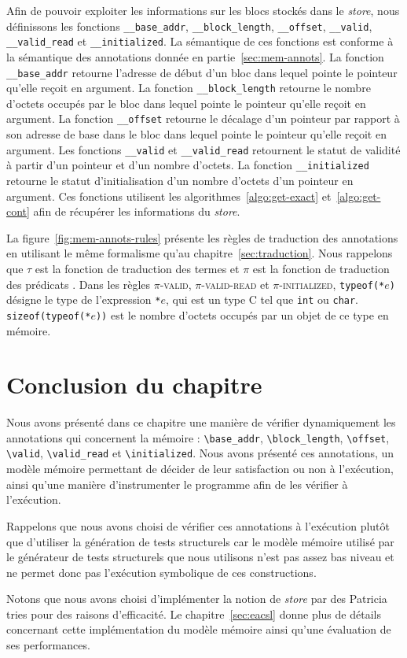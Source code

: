 Afin de pouvoir exploiter les informations sur les blocs stockés dans le
\textit{store}, nous définissons les fonctions \lstinline'__base_addr',
\lstinline'__block_length', \lstinline'__offset', \lstinline'__valid',
\lstinline'__valid_read' et \lstinline'__initialized'.
La sémantique de ces fonctions est conforme à la sémantique des annotations
\eacsl donnée en partie~\ref{sec:mem-annots}.
La fonction \lstinline'__base_addr' retourne l'adresse de début d'un bloc dans
lequel pointe le pointeur qu'elle reçoit en argument.
La fonction \lstinline'__block_length' retourne le nombre d'octets occupés par
le bloc dans lequel pointe le pointeur qu'elle reçoit en argument.
La fonction \lstinline'__offset' retourne le décalage d'un pointeur par rapport
à son adresse de base dans le bloc dans lequel pointe le pointeur qu'elle reçoit
en argument.
Les fonctions \lstinline'__valid' et \lstinline'__valid_read'
retournent le statut de validité à partir d'un pointeur et d'un nombre d'octets.
La fonction \lstinline'__initialized' retourne le statut d'initialisation
d'un nombre d'octets d'un pointeur en argument.
Ces fonctions utilisent les algorithmes~\ref{algo:get-exact}
et~\ref{algo:get-cont} afin de récupérer les informations du {\em store}.

La figure~\ref{fig:mem-annots-rules} présente les règles de traduction des
annotations en utilisant le même formalisme qu'au chapitre~\ref{sec:traduction}.
Nous rappelons que $\tau$ est la fonction de traduction des termes \eacsl et
$\pi$ est la fonction de traduction des prédicats \eacsl.
Dans les règles \textsc{$\pi$-valid}, \textsc{$\pi$-valid-read} et
\textsc{$\pi$-initialized}, \lstinline'typeof(*'$e$\lstinline')' désigne le type
de l'expression \lstinline'*'$e$, qui est un type C tel que \lstinline'int' ou
\lstinline'char'.
\lstinline'sizeof(typeof(*'$e$\lstinline'))' est le nombre d'octets occupés par
un objet de ce type en mémoire.


\section*{Conclusion du chapitre}


Nous avons présenté dans ce chapitre une manière de vérifier dynamiquement les
annotations \eacsl qui concernent la mémoire : \lstinline'\base_addr',
\lstinline'\block_length', \lstinline'\offset', \lstinline'\valid',
\lstinline'\valid_read' et \lstinline'\initialized'.
Nous avons présenté ces annotations, un modèle mémoire permettant de décider de
leur satisfaction ou non à l'exécution, ainsi qu'une manière d'instrumenter le
programme afin de les vérifier à l'exécution.

Rappelons que nous avons choisi de vérifier ces annotations à l'exécution plutôt
que d'utiliser la génération de tests structurels car le modèle mémoire utilisé
par le générateur de tests structurels que nous utilisons n'est pas assez bas
niveau et ne permet donc pas l'exécution symbolique de ces constructions.

Notons que nous avons choisi d'implémenter la notion de {\em store} par des
Patricia tries pour des raisons d'efficacité.
Le chapitre~\ref{sec:eacsl} donne plus de détails concernant cette
implémentation du modèle mémoire ainsi qu'une évaluation de ses performances.
